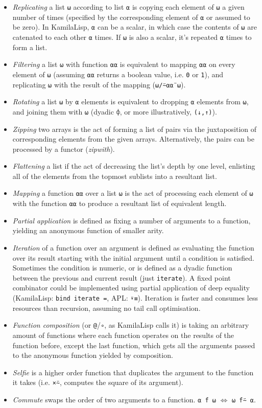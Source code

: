 \begin{itemize}
    \item \textit{Replicating} a list \verb|⍵| according to list \verb|⍺| is copying each element of \verb|⍵| a given number of times (specified by the corresponding element of \verb|⍺| or assumed to be zero). In KamilaLisp, \verb|⍺| can be a scalar, in which case the contents of \verb|⍵| are catenated to each other \verb|⍺| times. If \verb|⍵| is also a scalar, it's repeated \verb|⍺| times to form a list.
    \item \textit{Filtering} a list \verb|⍵| with function \verb|⍺⍺| is equivalent to mapping \verb|⍺⍺| on every element of \verb|⍵| (assuming \verb|⍺⍺| returns a boolean value, i.e. \verb|0| or \verb|1|), and replicating \verb|⍵| with the result of the mapping (\verb|⍵/⍨⍺⍺¨⍵|).
    \item \textit{Rotating} a list \verb|⍵| by \verb|⍺| elements is equivalent to dropping \verb|⍺| elements from \verb|⍵|, and joining them with \verb|⍵| (dyadic \verb|⌽|, or more illustratively, \verb|(↓,↑)|).
    \item \textit{Zipping} two arrays is the act of forming a list of pairs via the juxtaposition of corresponding elements from the given arrays. Alternatively, the pairs can be processed by a functor (\textit{zipwith}).
    \item \textit{Flattening} a list if the act of decreasing the list's depth by one level, enlisting all of the elements from the topmost sublists into a resultant list.
    \item \textit{Mapping} a function \verb|⍺⍺| over a list \verb|⍵| is the act of processing each element of \verb|⍵| with the function \verb|⍺⍺| to produce a resultant list of equivalent length.
    \item \textit{Partial application} is defined as fixing a number of arguments to a function, yielding an anonymous function of smaller arity.
    \item \textit{Iteration} of a function over an argument is defined as evaluating the function over its result starting with the initial argument until a condition is satisfied. Sometimes the condition is numeric, or is defined as a dyadic function between the previous and current result (just \verb|iterate|). A fixed point combinator could be implemented using partial application of deep equality (KamilaLisp: \verb|bind iterate =|, APL: \verb|⍣≡|). Iteration is faster and consumes less resources than recursion, assuming no tail call optimisation.
    \item \textit{Function composition} (or \verb|@|/\verb|∘|, as KamilaLisp calls it) is taking an arbitrary amount of functions where each function operates on the results of the function before, except the last function, which gets all the arguments passed to the anonymous function yielded by composition.
    \item \textit{Selfie} is a higher order function that duplicates the argument to the function it takes (i.e. \verb|×⍨|, computes the square of its argument).
    \item \textit{Commute} swaps the order of two arguments to a function. \verb|⍺ f ⍵| $\iff$ \verb|⍵ f⍨ ⍺|.
\end{itemize}
